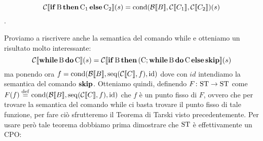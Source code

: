 $$\denot{\calC}{\condif{B}{C_1}{C_2}}{s} = \mathrm{cond}(\calB \llbracket B \rrbracket, \calC \llbracket C_1 \rrbracket, \calC \llbracket C_2 \rrbracket)(s)$$.

Proviamo a riscrivere anche la semantica del comando while e otteniamo un risultato molto interessante:
$$ \denot{\calC}{\while{B}{C}}{s} = \denot{\calC}{\condif{B}{(C ; \while{B}{C}}{\kw{skip}}}{s}$$
ma ponendo ora $f = \mathrm{cond}(\calB \llbracket B \rrbracket, \mathrm{seq}(\calC \llbracket C \rrbracket, f), \mathrm{id})$ dove con $id$ intendiamo la semantica del comando $\kw{skip}$.
Otteniamo quindi, definendo $\fund{F}{\ST}{\ST}$ come $F(f) \defeq \mathrm{cond}(\calB \llbracket B \rrbracket, \mathrm{seq}(\calC \llbracket C \rrbracket, f), \mathrm{id})$ che $f$ è un punto fisso di $F$, ovvero che per trovare la semantica del comando while ci basta trovare il punto fisso di tale funzione, per fare ciò sfrutteremo il Teorema di Tarski visto precedentemente. Per usare però tale teorema dobbiamo prima dimostrare che $\ST$ è effettivamente un CPO:

